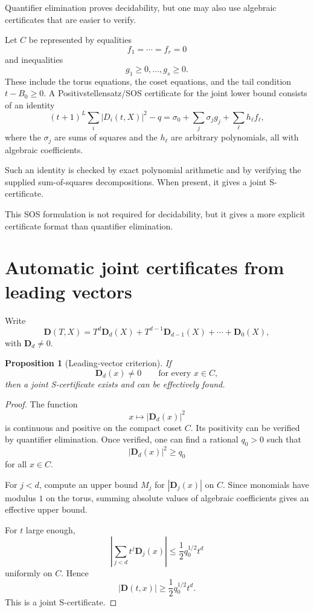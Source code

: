 \documentclass[11pt]{article}
\newtheorem{proposition}[theorem]{Proposition}
\begin{document}
Quantifier elimination proves decidability, but one may also use algebraic certificates that are easier to verify.

Let \(C\) be represented by equalities
\[
f_1=\cdots=f_r=0
\]
and inequalities
\[
g_1\ge0,\ldots,g_s\ge0.
\]
These include the torus equations, the coset equations, and the tail condition \(t-B_0\ge0\). A Positivstellensatz/SOS certificate for the joint lower bound consists of an identity
\[
(t+1)^L\sum_i |D_i(t,X)|^2-q
=
\sigma_0+\sum_j\sigma_j g_j+\sum_\ell h_\ell f_\ell,
\]
where the \(\sigma_j\) are sums of squares and the \(h_\ell\) are arbitrary polynomials, all with algebraic coefficients.

Such an identity is checked by exact polynomial arithmetic and by verifying the supplied sum-of-squares decompositions. When present, it gives a joint S-certificate.

This SOS formulation is not required for decidability, but it gives a more explicit certificate format than quantifier elimination.

\section{Automatic joint certificates from leading vectors}

Write
\[
\mathbf D(T,X)=T^d\mathbf D_d(X)+T^{d-1}\mathbf D_{d-1}(X)+\cdots+\mathbf D_0(X),
\]
with \(\mathbf D_d\ne0\).

\begin{proposition}[Leading-vector criterion]
If
\[
\mathbf D_d(x)\ne0
\qquad\text{for every }x\in C,
\]
then a joint S-certificate exists and can be effectively found.
\end{proposition}

\begin{proof}
The function
\[
x\mapsto |\mathbf D_d(x)|^2
\]
is continuous and positive on the compact coset \(C\). Its positivity can be verified by quantifier elimination. Once verified, one can find a rational \(q_0>0\) such that
\[
|\mathbf D_d(x)|^2\ge q_0
\]
for all \(x\in C\).

For \(j<d\), compute an upper bound \(M_j\) for \(|\mathbf D_j(x)|\) on \(C\). Since monomials have modulus \(1\) on the torus, summing absolute values of algebraic coefficients gives an effective upper bound.

For \(t\) large enough,
\[
\left|\sum_{j<d}t^j\mathbf D_j(x)\right|
\le
\frac12q_0^{1/2}t^d
\]
uniformly on \(C\). Hence
\[
|\mathbf D(t,x)|\ge \frac12q_0^{1/2}t^d.
\]
This is a joint S-certificate.
\end{proof}
\end{document}
